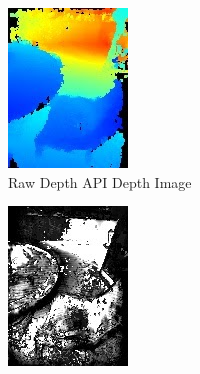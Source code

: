 \begin{figure}[ht!]
    \vspace{0.5em}

    \begin{subfigure}[b]{0.4\textwidth}
        \centering
        \includegraphics[width=0.8\linewidth]{images/depth_raw-depth-image}
        \caption{Raw Depth API Depth Image}
    \end{subfigure}%
    \begin{subfigure}[b]{0.4\textwidth}
        \centering
        \includegraphics[width=0.8\linewidth]{images/depth_raw-depth-confidence-image}

\end{subfigure}
\end{figure}
